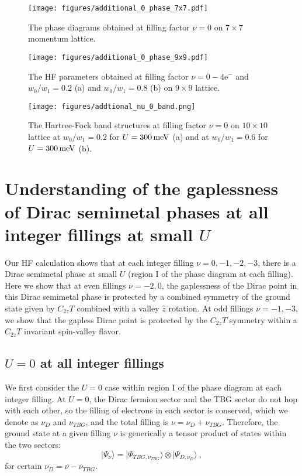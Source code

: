 \documentclass[prb,aps,nofootinbib,amssymb,twocolumn,superscriptaddress,10pt]{revtex4-2}
\begin{document}
\begin{widetext}
\begin{figure}
    \centering
    \texttt{[image: figures/additional\_0\_phase\_7x7.pdf]}
    \caption{The phase diagrams obtained at filling factor $\nu=0$ on $7\times 7$ momentum lattice.}
    \label{fig:add_0_phase_7x7}
\end{figure}

\begin{figure}
    \centering
    \texttt{[image: figures/additional\_0\_phase\_9x9.pdf]}
    \caption{The HF parameters obtained at filling factor $\nu=0-4\mathrm{e}^-$ and $w_0/w_1 = 0.2$ (a) and $w_0/w_1 = 0.8$ (b) on $9\times 9$ lattice.}
    \label{fig:add_0_phase_9x9}
\end{figure}

\begin{figure}
    \centering
    \texttt{[image: figures/addtional\_nu\_0\_band.png]}
    \caption{The Hartree-Fock band structures at filling factor $\nu=0$ on $10\times 10$ lattice at $w_0/w_1 = 0.2$ for $U = 300\,\rm meV$ (a) and at $w_0/w_1 = 0.6$ for $U = 300\,\rm meV$ (b).}
    \label{app_fig:add_0_band}
\end{figure}


\section{Understanding of the gaplessness of Dirac semimetal phases at all integer fillings at small \texorpdfstring{$U$}{U}}\label{sec:Ggammasymmetry}

Our HF calculation shows that at each integer filling $\nu=0,-1,-2,-3$, there is a Dirac semimetal phase at small $U$ (region I of the phase diagram at each filling).
Here we show that at even fillings $\nu=-2,0$, the gaplessness of the Dirac point in this Dirac semimetal phase is protected by a combined symmetry of the ground state given by $C_{2z}T$ combined with a valley $\hat{z}$ rotation. At odd fillings $\nu=-1,-3$, we show that the gapless Dirac point is protected by the $C_{2z}T$ symmetry within a $C_{2z}T$ invariant spin-valley flavor.

\subsection{\texorpdfstring{$U=0$}{U=0} at all integer fillings}\label{sec:Ggammasymmetry-1}

We first consider the $U=0$ case within region I of the phase diagram at each integer filling. At $U=0$, the Dirac fermion sector and the TBG sector do not hop with each other, so the filling of electrons in each sector is conserved, which we denote as $\nu_D$ and $\nu_{TBG}$, and the total filling is $\nu=\nu_D+\nu_{TBG}$. Therefore, the ground state at a given filling $\nu$ is generically a tensor product of states within the two sectors:
\begin{equation}\label{seq:prodU=0-general}
|\Psi_\nu\rangle=|\Psi_{TBG,\nu_{TBG}}\rangle\otimes|\Psi_{D,\nu_D}\rangle\ ,
\end{equation}
for certain $\nu_D=\nu-\nu_{TBG}$. 


\end{widetext}
\end{document}
